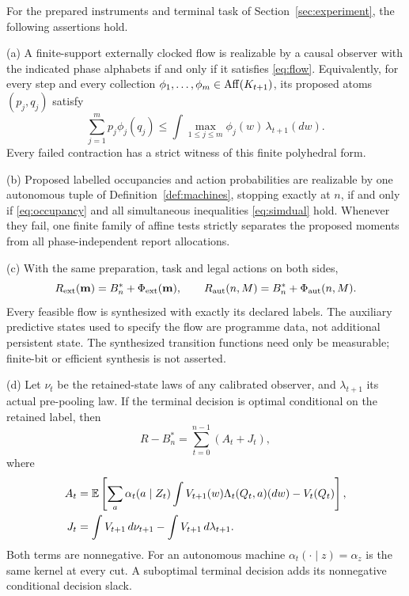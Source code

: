 \begin{theorem}\label{thm:completion}
For the prepared instruments and terminal task of Section~\ref{sec:experiment}, the following assertions hold.

\textup{(a)} A finite-support externally clocked flow is realizable by a causal observer with the indicated phase alphabets if and only if it satisfies \eqref{eq:flow}. Equivalently, for every step and every collection $\phi_1,\ldots,\phi_m\in\operatorname{Aff}(K_{t+1})$, its proposed atoms $(p_j,q_j)$ satisfy
\begin{equation}\label{eq:localdual}
 \sum_{j=1}^m p_j\phi_j(q_j)
 \le\int\max_{1\le j\le m}\phi_j(w)\,\lambda_{t+1}(dw).
\end{equation}
Every failed contraction has a strict witness of this finite polyhedral form.

\textup{(b)} Proposed labelled occupancies and action probabilities are realizable by one autonomous tuple of Definition~\ref{def:machines}, stopping exactly at $n$, if and only if \eqref{eq:occupancy} and all simultaneous inequalities \eqref{eq:simdual} hold. Whenever they fail, one finite family of affine tests strictly separates the proposed moments from all phase-independent report allocations.

\textup{(c)} With the same preparation, task and legal actions on both sides,
\begin{equation}\label{eq:exactrisk}
 R_{\mathrm{ext}}(\mathbf m)=B_n^*+\Phi_{\mathrm{ext}}(\mathbf m),\qquad
 R_{\mathrm{aut}}(n,M)=B_n^*+\Phi_{\mathrm{aut}}(n,M).
\end{equation}
Every feasible flow is synthesized with exactly its declared labels. The auxiliary predictive states used to specify the flow are programme data, not additional persistent state. The synthesized transition functions need only be measurable; finite-bit or efficient synthesis is not asserted.

\textup{(d)} Let $\nu_t$ be the retained-state laws of any calibrated observer, and $\lambda_{t+1}$ its actual pre-pooling law. If the terminal decision is optimal conditional on the retained label, then
\begin{equation}\label{eq:slack}
 R-B_n^*=\sum_{t=0}^{n-1}(A_t+J_t),
\end{equation}
where
\begin{align*}
 A_t&=\mathbb E\left[\sum_a\alpha_t(a\mid Z_t)
       \int V_{t+1}(w)\Lambda_t(Q_t,a)(dw)-V_t(Q_t)\right],\\
 J_t&=\int V_{t+1}\,d\nu_{t+1}-\int V_{t+1}\,d\lambda_{t+1}.
\end{align*}
Both terms are nonnegative. For an autonomous machine $\alpha_t(\cdot\mid z)=\alpha_z$ is the same kernel at every cut. A suboptimal terminal decision adds its nonnegative conditional decision slack.
\end{theorem}


